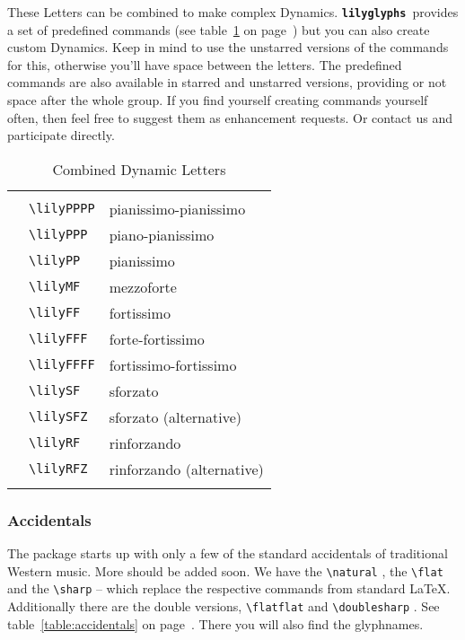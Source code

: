 \documentclass{article}
\newcommand{\lilyglyphs}{\texttt{\textbf{lilyglyphs }}}
\newcommand*{\cmd}[1]{\texttt{\textbackslash #1}}
\newcommand{\tmpCaption}{} %
\newcommand{\tmpLabel}{}
\newenvironment{reftable}[2]
	{%
		\renewcommand{\tmpCaption}{#1}
		\renewcommand{\tmpLabel}{#2}
		\begin{table}[ht]
		\begin{center}
		\begin{tabular}[t]{lll}
		\hline
		&\\
	}
	{%
		&\\
		\hline
		\end{tabular}
		\caption{\tmpCaption}
		\label{table:\tmpLabel}
		\end{center}
		\end{table}
	}
\begin{document}
These Letters can be combined to make complex Dynamics. \lilyglyphs provides a set of predefined commands (see table~\ref{table:combinedDynLetters} on page~\pageref{table:combinedDynLetters}) but you can also create custom Dynamics. Keep in mind to use the unstarred versions of the commands for this, otherwise you'll have space between the letters. The predefined commands are also available in starred and unstarred versions, providing or not space after the whole group.
If you find yourself creating commands yourself often, then feel free to suggest them as enhancement requests. Or contact us and participate directly.

\begin{reftable}{Combined Dynamic Letters}{combinedDynLetters}
\lilyPPPP* & \cmd{lilyPPPP} & pianissimo-pianissimo\\
\lilyPPP* & \cmd{lilyPPP} & piano-pianissimo\\
\lilyPP* & \cmd{lilyPP} & pianissimo\\
\lilyMF* & \cmd{lilyMF} & mezzoforte\\
\lilyFF* & \cmd{lilyFF} & fortissimo\\
\lilyFFF* & \cmd{lilyFFF} & forte-fortissimo\\
\lilyFFFF* & \cmd{lilyFFFF} & fortissimo-fortissimo\\

\lilySF* & \cmd{lilySF} & sforzato\\
\lilySFZ* & \cmd{lilySFZ} & sforzato (alternative)\\
\lilyRF* & \cmd{lilyRF} & rinforzando\\
\lilyRFZ* & \cmd{lilyRFZ} & rinforzando (alternative)\\

\end{reftable}

\subsubsection{Accidentals}
The package starts up with only a few of the standard accidentals of traditional Western music. More should be added soon. We have the \cmd{natural} \natural, the \cmd{flat} \flat* and the \cmd{sharp} \sharp* -- which replace the respective commands from standard \LaTeX. Additionally there are the double versions, \cmd{flatflat} \flatflat* and \cmd{doublesharp} \doublesharp. See table~\ref{table:accidentals} on page~\pageref{table:accidentals}. There you will also find the glyphnames.
\end{document}
